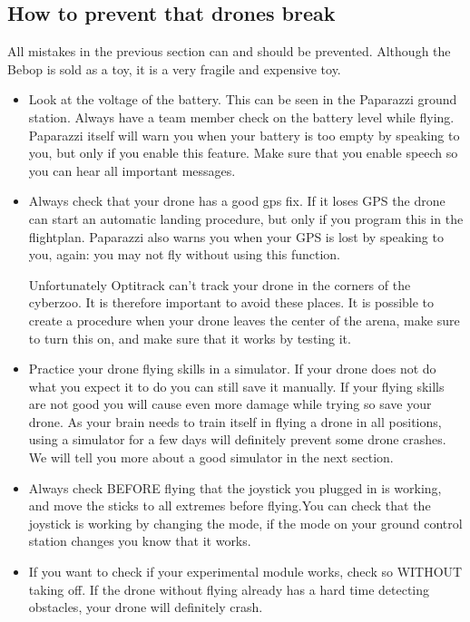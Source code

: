 \documentclass{article}
\begin{document}
\subsection*{How to prevent that drones break }
All mistakes in the previous section can and should be prevented. Although the Bebop is sold as a toy, it is a very fragile and expensive toy. 
\begin{itemize}
\item Look at the voltage of the battery. This can be seen in the Paparazzi ground station. Always have a team member check on the battery level while flying. Paparazzi itself will warn you when your battery is too empty by speaking to you, but only if you enable this feature. Make sure that you enable speech so you can hear all important messages.

\item Always check that your drone has a good gps fix. If it loses GPS the drone can start an automatic landing procedure, but only if you program this in the flightplan. Paparazzi also warns you when your GPS is lost by speaking to you, again: you may not fly without using this function. 

Unfortunately Optitrack can't track your drone in the corners of the cyberzoo. It is therefore important to avoid these places. It is possible to create a procedure when your drone leaves the center of the arena, make sure to turn this on, and make sure that it works by testing it. 

\item Practice your drone flying skills in a simulator. If your drone does not do what you expect it to do you can still save it manually. If your flying skills are not good you will cause even more damage while trying so save your drone. As your brain needs to train itself in flying a drone in all positions, using a simulator for a few days will definitely prevent some drone crashes. We will tell you more about a good simulator in the next section. 

\item Always check BEFORE flying that the joystick you plugged in is working, and move the sticks to all extremes before flying.You can check that the joystick is working by changing the mode, if the mode on your ground control station changes you know that it works. 
\item If you want to check if your experimental module works, check so WITHOUT taking off. If the drone without flying already has a hard time detecting obstacles, your drone will definitely crash.
\end{itemize}
\end{document}
